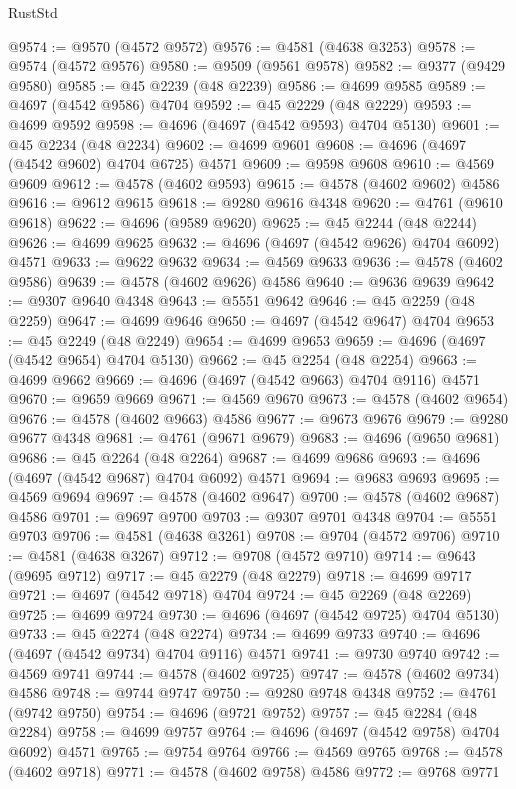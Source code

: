 \begin{lexlean}{RustStd}
\begin{coremodule}
@9574 := @9570 (@4572 @9572)
@9576 := @4581 (@4638 @3253)
@9578 := @9574 (@4572 @9576)
@9580 := @9509 (@9561 @9578)
@9582 := @9377 (@9429 @9580)
@9585 := @45 @2239 (@48 @2239)
@9586 := @4699 @9585
@9589 := @4697 (@4542 @9586) @4704
@9592 := @45 @2229 (@48 @2229)
@9593 := @4699 @9592
@9598 := @4696 (@4697 (@4542 @9593) @4704 @5130)
@9601 := @45 @2234 (@48 @2234)
@9602 := @4699 @9601
@9608 := @4696 (@4697 (@4542 @9602) @4704 @6725) @4571
@9609 := @9598 @9608
@9610 := @4569 @9609
@9612 := @4578 (@4602 @9593)
@9615 := @4578 (@4602 @9602) @4586
@9616 := @9612 @9615
@9618 := @9280 @9616 @4348
@9620 := @4761 (@9610 @9618)
@9622 := @4696 (@9589 @9620)
@9625 := @45 @2244 (@48 @2244)
@9626 := @4699 @9625
@9632 := @4696 (@4697 (@4542 @9626) @4704 @6092) @4571
@9633 := @9622 @9632
@9634 := @4569 @9633
@9636 := @4578 (@4602 @9586)
@9639 := @4578 (@4602 @9626) @4586
@9640 := @9636 @9639
@9642 := @9307 @9640 @4348
@9643 := @5551 @9642
@9646 := @45 @2259 (@48 @2259)
@9647 := @4699 @9646
@9650 := @4697 (@4542 @9647) @4704
@9653 := @45 @2249 (@48 @2249)
@9654 := @4699 @9653
@9659 := @4696 (@4697 (@4542 @9654) @4704 @5130)
@9662 := @45 @2254 (@48 @2254)
@9663 := @4699 @9662
@9669 := @4696 (@4697 (@4542 @9663) @4704 @9116) @4571
@9670 := @9659 @9669
@9671 := @4569 @9670
@9673 := @4578 (@4602 @9654)
@9676 := @4578 (@4602 @9663) @4586
@9677 := @9673 @9676
@9679 := @9280 @9677 @4348
@9681 := @4761 (@9671 @9679)
@9683 := @4696 (@9650 @9681)
@9686 := @45 @2264 (@48 @2264)
@9687 := @4699 @9686
@9693 := @4696 (@4697 (@4542 @9687) @4704 @6092) @4571
@9694 := @9683 @9693
@9695 := @4569 @9694
@9697 := @4578 (@4602 @9647)
@9700 := @4578 (@4602 @9687) @4586
@9701 := @9697 @9700
@9703 := @9307 @9701 @4348
@9704 := @5551 @9703
@9706 := @4581 (@4638 @3261)
@9708 := @9704 (@4572 @9706)
@9710 := @4581 (@4638 @3267)
@9712 := @9708 (@4572 @9710)
@9714 := @9643 (@9695 @9712)
@9717 := @45 @2279 (@48 @2279)
@9718 := @4699 @9717
@9721 := @4697 (@4542 @9718) @4704
@9724 := @45 @2269 (@48 @2269)
@9725 := @4699 @9724
@9730 := @4696 (@4697 (@4542 @9725) @4704 @5130)
@9733 := @45 @2274 (@48 @2274)
@9734 := @4699 @9733
@9740 := @4696 (@4697 (@4542 @9734) @4704 @9116) @4571
@9741 := @9730 @9740
@9742 := @4569 @9741
@9744 := @4578 (@4602 @9725)
@9747 := @4578 (@4602 @9734) @4586
@9748 := @9744 @9747
@9750 := @9280 @9748 @4348
@9752 := @4761 (@9742 @9750)
@9754 := @4696 (@9721 @9752)
@9757 := @45 @2284 (@48 @2284)
@9758 := @4699 @9757
@9764 := @4696 (@4697 (@4542 @9758) @4704 @6092) @4571
@9765 := @9754 @9764
@9766 := @4569 @9765
@9768 := @4578 (@4602 @9718)
@9771 := @4578 (@4602 @9758) @4586
@9772 := @9768 @9771

\end{coremodule}
\end{lexlean}
